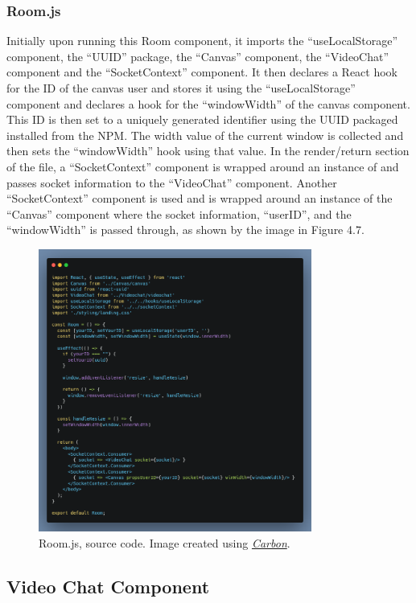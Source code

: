 \subsubsection{Room.js}
Initially upon running this Room component, it imports the “useLocalStorage” component, the “UUID” package, the “Canvas” component, the “VideoChat” component and the “SocketContext” component. It then declares a React hook for the ID of the canvas user and stores it using the “useLocalStorage” component and declares a hook for the “windowWidth” of the canvas component. This ID is then set to a uniquely generated identifier using the UUID packaged installed from the NPM. The width value of the current window is collected and then sets the “windowWidth” hook using that value. In the render/return section of the file, a “SocketContext” component is wrapped around an instance of and passes socket information to the “VideoChat” component. Another “SocketContext” component is used and is wrapped around an instance of the “Canvas” component where the socket information, “userID”, and the “windowWidth” is passed through, as shown by the image in Figure 4.7.
\begin{figure}[H]
    \centering
    \includegraphics[width=0.8\textwidth]{img/SystemDesign/roomJs.png}
    \caption{Room.js, source code. Image created using \href{https://carbon.now.sh/}{\textit{Carbon}}.}
\end{figure}

\subsection{Video Chat Component}
